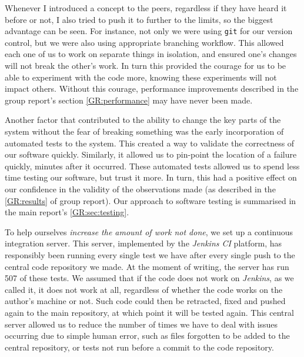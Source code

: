 Whenever I introduced a concept to the peers, regardless if they have heard it before or not, I also tried to push it to further to the limits, so the biggest advantage can be seen. 
For instance, not only we were using \verb"git"\cite{git} for our version control, but we were also using appropriate branching workflow. 
This allowed each one of us to work on separate things in isolation, and ensured one's changes will not break the other's work. 
In turn this provided the courage for us to be able to experiment with the code more, knowing these experiments will not impact others.
Without this courage, performance improvements described in the group report's section \autoref*{GR:performance} may have never been made.

Another factor that contributed to the ability to change the key parts of the system without the fear of breaking something was the early incorporation of automated tests to the system. 
This created a way to validate the correctness of our software quickly.
Similarly, it allowed us to pin-point the location of a failure quickly, minutes after it occurred.
These automated tests allowed us to spend less time testing our software, but trust it more.
In turn, this had a positive effect on our confidence in the validity of the observations made (as described in the \autoref*{GR:results} of group report). Our approach to software testing is summarised in the main report's \autoref*{GR:sec:testing}.

To help ourselves \emph{increase the amount of work not done}, we set up a continuous integration server.
This server, implemented by the \emph{Jenkins CI} platform\cite{_jenkins_????}, has responsibly been running every single test we have after every single push to the central code repository we made. At the moment of writing, the server has run 507 of these tests.
We assumed that if the code does not work on \emph{Jenkins}, as we called it, it does not work at all, regardless of whether the code works on the author's machine or not. 
Such code could then be retracted, fixed and pushed again to the main repository, at which point it will be tested again. 
This central server allowed us to reduce the number of times we have to deal with issues occurring due to simple human error, such as files forgotten to be added to the central repository, or tests not run before a commit to the code repository.

